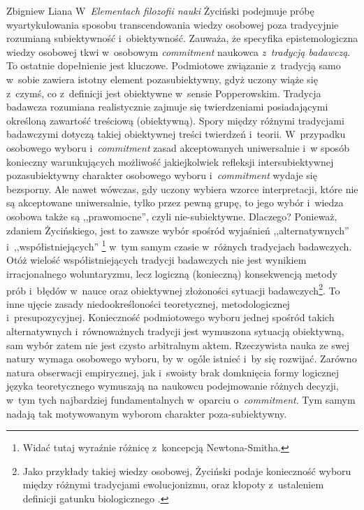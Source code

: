 \begin{artplenv}{Zbigniew Liana}
W~\textit{Elementach filozofii nauki}
\parencites*[][]{zycinski_elementy_1996}[][]{zycinski_elementy_2015} %
 Życiński podejmuje próbę wyartykułowania sposobu transcendowania wiedzy osobowej poza tradycyjnie rozumianą subiektywność i~obiektywność. Zauważa, że specyfika epistemologiczna wiedzy osobowej tkwi w~osobowym \textit{commitment} naukowca \textit{z~tradycją badawczą}. To ostatnie dopełnienie jest kluczowe. Podmiotowe związanie z~tradycją samo w~sobie zawiera istotny element pozasubiektywny, gdyż uczony wiąże się z~czymś, co z~definicji jest obiektywne w~sensie Popperowskim. Tradycja badawcza rozumiana realistycznie zajmuje się twierdzeniami posiadającymi określoną zawartość treściową (obiektywną). Spory między różnymi tradycjami badawczymi dotyczą takiej obiektywnej treści twierdzeń i~teorii. W~przypadku osobowego wyboru i~\textit{commitment} zasad akceptowanych uniwersalnie i~w sposób konieczny warunkujących możliwość jakiejkolwiek refleksji intersubiektywnej pozasubiektywny charakter osobowego wyboru i~\textit{commitment} wydaje się bezsporny. Ale nawet wówczas, gdy uczony wybiera wzorce interpretacji, które nie są akceptowane uniwersalnie, tylko przez pewną grupę, to jego wybór i~wiedza osobowa także są ,,prawomocne'', czyli nie-subiektywne. Dlaczego? Ponieważ, zdaniem Życińskiego, jest to zawsze wybór spośród wyjaśnień ,,alternatywnych'' i~,,współistniejących'' 
\parencites[][s.~184]{zycinski_elementy_1996}[][s.~250]{zycinski_elementy_2015}%
\footnote{Widać tutaj wyraźnie różnicę z~koncepcją Newtona-Smitha.} w~tym samym czasie w~różnych tradycjach badawczych. Otóż wielość współistniejących tradycji badawczych nie jest wynikiem irracjonalnego woluntaryzmu, lecz logiczną (konieczną) konsekwencją metody prób i~błędów w~nauce oraz obiektywnej złożoności sytuacji badawczych\footnote{Jako przykłady takiej wiedzy osobowej, Życiński podaje konieczność wyboru między różnymi tradycjami ewolucjonizmu, oraz kłopoty z~ustaleniem definicji gatunku biologicznego 
\parencites[zob.][s.~184n]{zycinski_elementy_1996}[][s.~250nn]{zycinski_elementy_2015}.%
}. To inne ujęcie zasady niedookreśloności teoretycznej, metodologicznej i~presupozycyjnej. Konieczność podmiotowego wyboru jednej spośród takich alternatywnych i~równoważnych tradycji jest wymuszona sytuacją obiektywną, sam wybór zatem nie jest czysto arbitralnym aktem. Rzeczywista nauka ze swej natury wymaga osobowego wyboru, by w~ogóle istnieć i~by się rozwijać. Zarówno natura obserwacji empirycznej, jak i~swoisty brak domknięcia formy logicznej języka teoretycznego wymuszają na naukowcu podejmowanie różnych decyzji, w~tym tych najbardziej fundamentalnych w~oparciu o~\textit{commitment}. Tym samym nadają tak motywowanym wyborom charakter poza-subiektywny.


\end{artplenv}
